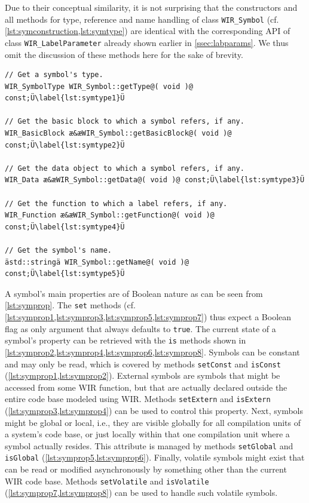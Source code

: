 Due to their conceptual similarity, it is not surprising that the constructors and all methods for type, reference and name handling of class \texttt{WIR\_Symbol} (cf. \cref{lst:symconstruction,lst:symtype}) are identical with the corresponding \gls{API} of class \texttt{WIR\_LabelParameter} already shown earlier in \cref{ssec:labparams}.
We thus omit the discussion of these methods here for the sake of brevity.

\begin{lstlisting}[style=code,float=!b,caption={Type, Reference and Name Handling of Class \texttt{WIR\_Symbol}},label=lst:symtype]
// Get a symbol's type.
WIR_SymbolType WIR_Symbol::getType@( void )@ const;Ü\label{lst:symtype1}Ü

// Get the basic block to which a symbol refers, if any.
WIR_BasicBlock æ&æWIR_Symbol::getBasicBlock@( void )@ const;Ü\label{lst:symtype2}Ü

// Get the data object to which a symbol refers, if any.
WIR_Data æ&æWIR_Symbol::getData@( void )@ const;Ü\label{lst:symtype3}Ü

// Get the function to which a label refers, if any.
WIR_Function æ&æWIR_Symbol::getFunction@( void )@ const;Ü\label{lst:symtype4}Ü

// Get the symbol's name.
ästd::stringä WIR_Symbol::getName@( void )@ const;Ü\label{lst:symtype5}Ü
\end{lstlisting}

A symbol's main properties are of Boolean nature as can be seen from \cref{lst:symprop}.
The \texttt{set} methods (cf. \cref{lst:symprop1,lst:symprop3,lst:symprop5,lst:symprop7}) thus expect a Boolean flag as only argument that always defaults to \texttt{true}.
The current state of a symbol's property can be retrieved with the \texttt{is} methods shown in \cref{lst:symprop2,lst:symprop4,lst:symprop6,lst:symprop8}.
Symbols can be constant and may only be read, which is covered by methods \texttt{setConst} and \texttt{isConst} (\cref{lst:symprop1,lst:symprop2}).
External symbols are symbols that might be accessed from some \gls{WIR} function, but that are actually declared outside the entire code base modeled using \gls{WIR}.
Methods \texttt{setExtern} and \texttt{isExtern} (\cref{lst:symprop3,lst:symprop4}) can be used to control this property.
Next, symbols might be global or local, i.e., they are visible globally for all compilation units of a system's code base, or just locally within that one compilation unit where a symbol actually resides.
This attribute is managed by methods \texttt{setGlobal} and \texttt{isGlobal} (\cref{lst:symprop5,lst:symprop6}).
Finally, volatile symbols might exist that can be read or modified asynchronously by something other than the current \gls{WIR} code base.
Methods \texttt{setVolatile} and \texttt{isVolatile} (\cref{lst:symprop7,lst:symprop8}) can be used to handle such volatile symbols.

